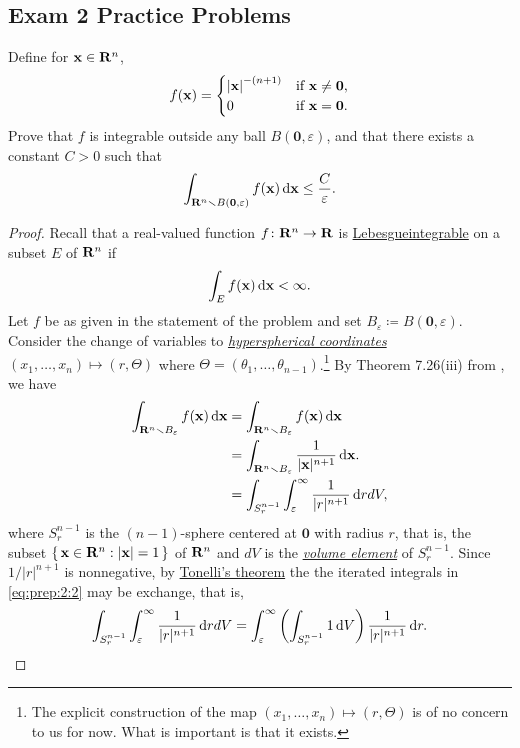 \subsection{Exam 2 Practice Problems}
\begin{problem}
Define for $\mathbf{x}\in\mathbf{R}^n$,
\[
f(\mathbf{x})=
\begin{cases}
\left|\mathbf{x}\right|^{-(n+1)}&\text{if $\mathbf{x}\neq \mathbf{0}$,}\\
0&\text{if $\mathbf{x}=\mathbf{0}$.}
\end{cases}
\]
Prove that $f$ is integrable outside any ball $B(\mathbf{0},\varepsilon)$,
and that there exists a constant $C>0$ such that
\[
\int_{\mathbf{R}^n\smallsetminus B(\mathbf{0},\varepsilon)}f(\mathbf{x}) \mathop{}\!\mathrm{d} \mathbf{x}\leq\frac{C}{\varepsilon}.
\]
\end{problem}
\begin{proof}
Recall that a real-valued function $f\colon\mathbf{R}^n\to\mathbf{R}$ is
\href{https://en.wikipedia.org/wiki/Fubini's_theorem#Tonelli.27s_theorem_for_non-negative_functions}{Lebesgueintegrable}
on a subset $E$ of $\mathbf{R}^n$ if
\begin{equation}
\label{eq:prep:2:1}
\int_E f(\mathbf{x})\mathop{}\!\mathrm{d}\mathbf{x}<\infty.
\end{equation}
Let $f$ be as given in the statement of the problem and set
$B_\varepsilon\coloneqq B(\mathbf{0},\varepsilon)$. Consider
the change of variables to
\href{https://en.wikipedia.org/wiki/N-sphere#Spherical_coordinates}{\emph{hyperspherical
    coordinates}} $(x_1,\dotsc,x_n)\mapsto(r,\Theta)$ where
$\Theta=(\theta_1,\dotsc,\theta_{n-1})$.\footnote{The explicit construction
  of the map $(x_1,\dotsc,x_n)\mapsto(r,\Theta)$ is of no concern to us for
  now. What is important is that it exists.} By Theorem 7.26(iii) from
\cite[Ch.\@ 7, p.\@ 123]{rudin-2}, we have
\begin{equation}
\label{eq:prep:2:2}
\begin{aligned}
\int_{\mathbf{R}^n\smallsetminus B_\varepsilon}f(\mathbf{x})\mathop{}\!\mathrm{d}\mathbf{x}
&=\int_{\mathbf{R}^n\smallsetminus B_\varepsilon} f(\mathbf{x})\mathop{}\!\mathrm{d}\mathbf{x}\\
&=\int_{\mathbf{R}^n\smallsetminus
  B_\varepsilon}\frac{1}{|\mathbf{x}|^{n+1}}\mathop{}\!\mathrm{d}\mathbf{x}.\\
&=\int_{S^{n-1}_r}\int_\varepsilon^\infty\frac{1}{|r|^{n+1}} \mathop{}\!\mathrm{d} r dV,
\end{aligned}
\end{equation}
where $S_r^{n-1}$ is the $(n-1)$-sphere centered at $\mathbf{0}$ with
radius $r$, that is, the subset $\left\{\,\mathbf{x}\in\mathbf{R}^n:|\mathbf{x}|=1\,\right\}$
of $\mathbf{R}^n$ and $dV$ is the
\href{https://en.wikipedia.org/wiki/Volume_element}{\emph{volume element}}
of $S_r^{n-1}$. Since $1/|r|^{n+1}$ is nonnegative, by
\href{https://en.wikipedia.org/wiki/Fubini's_theorem#Tonelli.27s_theorem}{Tonelli's
  theorem} the the iterated integrals in \eqref{eq:prep:2:2} may be
exchange, that is,
\begin{equation}
  \label{eq:prep:2:3}
\int_{S^{n-1}_r}\int_\varepsilon^\infty\frac{1}{|r|^{n+1}} \mathop{}\!\mathrm{d} r dV=
\int_\varepsilon^\infty\left(\int_{S_r^{n-1}}1\mathop{}\!\mathrm{d}
  V\right)\frac{1}{|r|^{n+1}}\mathop{}\!\mathrm{d} r.
\end{equation}


\end{proof}
